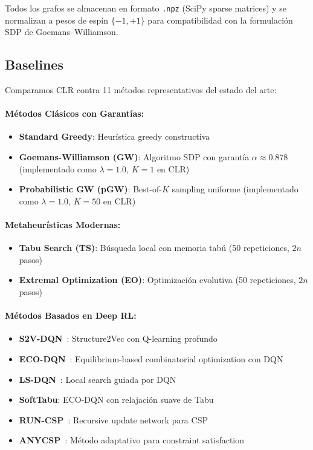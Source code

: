 \documentclass{article}
\begin{document}
Todos los grafos se almacenan en formato \texttt{.npz} (SciPy sparse matrices) y se normalizan a pesos de espín $\{-1, +1\}$ para compatibilidad con la formulación SDP de Goemans–Williamson.

\subsection{Baselines}

Comparamos CLR contra 11 métodos representativos del estado del arte:

\paragraph{Métodos Clásicos con Garantías:}
\begin{itemize}
    \item \textbf{Standard Greedy}: Heurística greedy constructiva
    \item \textbf{Goemans-Williamson (GW)}: Algoritmo SDP con garantía $\alpha \approx 0.878$ (implementado como $\lambda=1.0$, $K=1$ en CLR)
    \item \textbf{Probabilistic GW (pGW)}: Best-of-$K$ sampling uniforme (implementado como $\lambda=1.0$, $K=50$ en CLR)
\end{itemize}

\paragraph{Metaheurísticas Modernas:}
\begin{itemize}
    \item \textbf{Tabu Search (TS)}: Búsqueda local con memoria tabú (50 repeticiones, $2n$ pasos)
    \item \textbf{Extremal Optimization (EO)}: Optimización evolutiva (50 repeticiones, $2n$ pasos)
\end{itemize}

\paragraph{Métodos Basados en Deep RL:}
\begin{itemize}
    \item \textbf{S2V-DQN}~\cite{dai2017learning}: Structure2Vec con Q-learning profundo
    \item \textbf{ECO-DQN}~\cite{wu2022learning}: Equilibrium-based combinatorial optimization con DQN
    \item \textbf{LS-DQN}~\cite{fang2020learning}: Local search guiada por DQN
    \item \textbf{SoftTabu}: ECO-DQN con relajación suave de Tabu
    \item \textbf{RUN-CSP}~\cite{qin2021solving}: Recursive update network para CSP
    \item \textbf{ANYCSP}~\cite{wu2021learning}: Método adaptativo para constraint satisfaction
\end{itemize}
\end{document}

